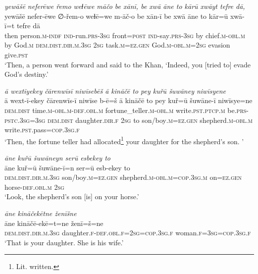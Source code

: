 \ea \label{KŠ.97}
\textit{yewāšē neferēwe řemo weɫēwe māčo be xānī, be xwā āne to kārū xwāyt tefre dā,} \\ 
\gll yewāšē nefer-ēwe ∅-řem-o weɫē=we m-āč-o be xān-ī be xwā āne to kār=ū xwā-ī=t tefre dā \\ 
 then person\textsc{.m}\textsc{-indf} \textsc{ind-}run\textsc{.prs}\textsc{-3sg} front\textsc{=\textsc{post}} \textsc{ind-}say\textsc{.prs}\textsc{-3sg} by chief\textsc{.m}\textsc{-obl}\textsc{.m} by God\textsc{.m} \textsc{dem.dist}\textsc{.dir}\textsc{.m}\textsc{.3sg} \textsc{2sg} task\textsc{.m}\textsc{\textsc{=ez.gen}} God\textsc{.m}\textsc{-obl}\textsc{.m}\textsc{=\textsc{2sg}} evasion give\textsc{.pst} \\ 
\glt `Then, a person went forward and said to the Khan, ‘Indeed, you [tried to] evade God’s destiny.'
\z 
 
\ea \label{KŠ.99}
\textit{ā wextīyekey čārenwīsī niwīsebēš ā kināčē to pey kuřū šuwāney niwīsyene} \\ 
\gll ā wext-ī-ekey čārenwīs-ī niwīse b-ē=š ā kināčē to pey kuř=ū šuwāne-ī niwīsye=ne \\ 
 \textsc{dem.dist} time\textsc{.m}\textsc{-obl}\textsc{.m}\textsc{-def}\textsc{.obl}\textsc{.m} fortune\_teller\textsc{.m}\textsc{-obl}\textsc{.m} write\textsc{.pst}\textsc{.ptcp}\textsc{.m} be\textsc{.prs}\textsc{-pstc}\textsc{.3sg}\textsc{=3sg} \textsc{dem.dist} daughter\textsc{.dir}\textsc{.f} \textsc{2sg} to son/boy\textsc{.m}\textsc{\textsc{=ez.gen}} shepherd\textsc{.m}\textsc{-obl}\textsc{.m} write\textsc{.pst}.pass\textsc{=cop}\textsc{.3sg}\textsc{.f} \\ 
\glt `Then, the fortune teller had allocated\footnote{Lit. written.} your daughter for the shepherd’s son. '
\z 
 
\ea \label{KŠ.100}
\textit{āne kuřū šuwāneyn serū esbekey to} \\ 
\gll āne kuř=ū šuwāne-ī=n ser=ū esb-ekey to \\ 
 \textsc{dem.dist}\textsc{.dir}\textsc{.m}\textsc{.3sg} son/boy\textsc{.m}\textsc{\textsc{=ez.gen}} shepherd\textsc{.m}\textsc{-obl}\textsc{.m}\textsc{=cop}\textsc{.3sg}\textsc{.m} on\textsc{\textsc{=ez.gen}} horse\textsc{-def}\textsc{.obl}\textsc{.m} \textsc{2sg} \\ 
\glt `Look, the shepherd’s son [is] on your horse.'
\z 
 
\ea \label{KŠ.101}
\textit{āne kināčekētne ženīšne} \\ 
\gll āne kināčē-ekē=t=ne ženī=š=ne \\ 
 \textsc{dem.dist}\textsc{.dir}\textsc{.m}\textsc{.3sg} daughter\textsc{.f}\textsc{-def}\textsc{.obl}\textsc{.f}\textsc{=\textsc{2sg}}\textsc{=cop}\textsc{.3sg}\textsc{.f} woman\textsc{.f}\textsc{=3sg}\textsc{=cop}\textsc{.3sg}\textsc{.f} \\ 
\glt `That is your daughter. She is his wife.'
\z 
 
